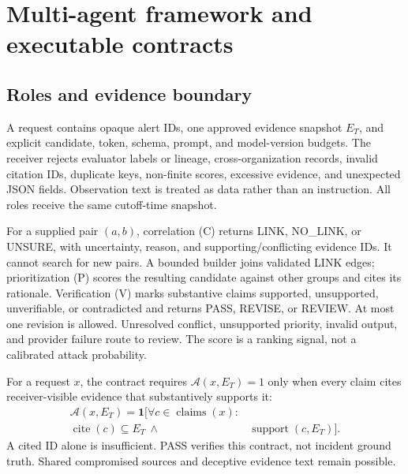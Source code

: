 \section{Multi-agent framework and executable contracts}\label{sec:agents}
\subsection{Roles and evidence boundary}
A request contains opaque alert IDs, one approved evidence snapshot $E_T$, and explicit candidate, token, schema, prompt, and model-version budgets. The receiver rejects evaluator labels or lineage, cross-organization records, invalid citation IDs, duplicate keys, non-finite scores, excessive evidence, and unexpected JSON fields. Observation text is treated as data rather than an instruction. All roles receive the same cutoff-time snapshot.

For a supplied pair $(a,b)$, correlation (C) returns LINK, NO\_LINK, or UNSURE, with uncertainty, reason, and supporting/conflicting evidence IDs. It cannot search for new pairs. A bounded builder joins validated LINK edges; prioritization (P) scores the resulting candidate against other groups and cites its rationale. Verification (V) marks substantive claims supported, unsupported, unverifiable, or contradicted and returns PASS, REVISE, or REVIEW. At most one revision is allowed. Unresolved conflict, unsupported priority, invalid output, and provider failure route to review. The score is a ranking signal, not a calibrated attack probability.

For a request $x$, the contract requires $\mathcal A(x,E_T)=1$ only when every claim cites receiver-visible evidence that substantively supports it:
\begin{equation}\label{eq:citationgate}
\begin{aligned}
\mathcal A(x,E_T)=\mathbf1\bigl[\forall c\in\operatorname{claims}(x):{}&\\
\operatorname{cite}(c)\subseteq E_T\ \land\ {}&\operatorname{support}(c,E_T)\bigr].
\end{aligned}
\end{equation}
A cited ID alone is insufficient. PASS verifies this contract, not incident ground truth. Shared compromised sources and deceptive evidence text remain possible.

